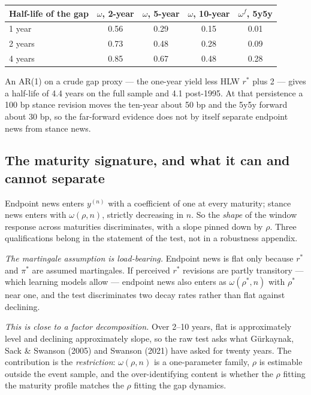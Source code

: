 \documentclass[11pt]{article}
\newcommand{\rs}{$r^{*}$}
\begin{document}
\begin{center}\small
\begin{tabular}{lcccc}
\toprule
Half-life of the gap & $\omega$, 2-year & $\omega$, 5-year & $\omega$, 10-year & $\omega^{f}$, 5y5y\\ \midrule
1 year  & 0.56 & 0.29 & 0.15 & 0.01\\
2 years & 0.73 & 0.48 & 0.28 & 0.09\\
4 years & 0.85 & 0.67 & 0.48 & 0.28\\
\bottomrule\end{tabular}
\end{center}

\noindent An AR(1) on a crude gap proxy --- the one-year yield less HLW \rs{} plus 2 --- gives a
half-life of 4.4 years on the full sample and 4.1 post-1995. At that persistence a 100 bp stance
revision moves the ten-year about 50 bp and the 5y5y forward about 30 bp, so the far-forward
evidence does not by itself separate endpoint news from stance news.

\subsection{The maturity signature, and what it can and cannot separate}

Endpoint news enters $y^{(n)}$ with a coefficient of one at every maturity; stance news enters
with $\omega(\rho,n)$, strictly decreasing in $n$. So the \emph{shape} of the window response
across maturities discriminates, with a slope pinned down by $\rho$. Three qualifications
belong in the statement of the test, not in a robustness appendix.

\emph{The martingale assumption is load-bearing.} Endpoint news is flat only because $r^{*}$
and $\pi^{*}$ are assumed martingales. If perceived \rs{} revisions are partly transitory ---
which learning models allow --- endpoint news also enters as $\omega(\rho^{*},n)$ with
$\rho^{*}$ near one, and the test discriminates two decay rates rather than flat against
declining.

\emph{This is close to a factor decomposition.} Over 2--10 years, flat is approximately level
and declining approximately slope, so the raw test asks what Gürkaynak, Sack \& Swanson (2005)
and Swanson (2021) have asked for twenty years. The contribution is the \emph{restriction}:
$\omega(\rho,n)$ is a one-parameter family, $\rho$ is estimable outside the event sample, and
the over-identifying content is whether the $\rho$ fitting the maturity profile matches the
$\rho$ fitting the gap dynamics.
\end{document}
